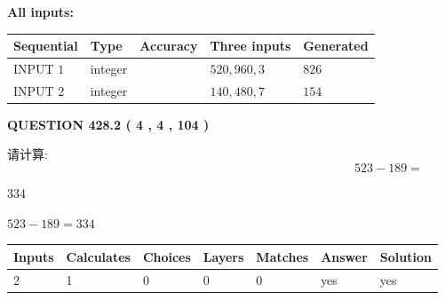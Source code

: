 \documentclass{ctexart}
\begin{document}
   
   
   
\noindent\vspace{0.1in}\hspace{-0.08in} {\textbf{\Large{All inputs: }}}
   
   
  
  
\noindent\begin{tabular}{|l|l|l|l|l|}
\hline
 Sequential & Type & Accuracy & Three inputs & Generated \\ 
\hline
 
 
  INPUT $  1 $ & integer &  & $
 520
 , 
 960
 , 
 3
 $ & $ 826 $ 
 \\  \hline  
 
 
  INPUT $  2 $ & integer &  & $
 140
 , 
 480
 , 
 7
 $ & $ 154 $ 
 \\  \hline  
 \end{tabular}
   
   
  
\vspace{0.2in}
  
{\textbf{\Large{QUESTION
428.2 
 ( 4 , 4 , 104 )
}}}
  
  
 
请计算:
\begin{equation}
523 -   %
189 = \nonumber
\end{equation}
 
 
 
\noindent{}
 
 

334
 
 
\noindent{}
 
 

 
 
 
\noindent{}
 
 

$ %
523 -  %
189=   %
334$
 
 
\noindent{}
 
 

 
   
   
   
   
\noindent\begin{tabular}{|l|l|l|l|l|l|l|}
 \hline
Inputs & Calculates & Choices & Layers & Matches & Answer & Solution \\ \hline
 2  & 
 1  & 
 0
  & 
 0  & 
 0  & 
  yes & 
  yes 
  \\ \hline
 \end{tabular}
   
\end{document}
